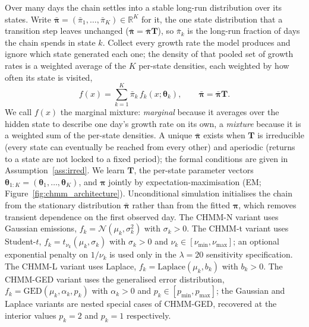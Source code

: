 Over many days the chain settles into a stable long-run distribution over its states. Write $\bar{\boldsymbol\pi} = (\bar\pi_1, \ldots, \bar\pi_K) \in \mathbb{R}^K$ for it, the one state distribution that a transition step leaves unchanged ($\bar{\boldsymbol{\pi}} = \bar{\boldsymbol{\pi}}\mathbf{T}$), so $\bar\pi_k$ is the long-run fraction of days the chain spends in state $k$. Collect every growth rate the model produces and ignore which state generated each one; the density of that pooled set of growth rates is a weighted average of the $K$ per-state densities, each weighted by how often its state is visited,
\begin{equation}
    f(x) = \sum_{k=1}^{K} \bar{\pi}_k\, f_k(x; \boldsymbol\theta_k), \qquad \bar{\boldsymbol{\pi}} = \bar{\boldsymbol{\pi}} \mathbf{T}.
    \label{eq:mixture}
\end{equation}
We call $f(x)$ the marginal mixture: \emph{marginal} because it averages over the hidden state to describe one day's growth rate on its own, a \emph{mixture} because it is a weighted sum of the per-state densities. A unique $\bar{\boldsymbol\pi}$ exists when $\mathbf{T}$ is irreducible (every state can eventually be reached from every other) and aperiodic (returns to a state are not locked to a fixed period); the formal conditions are given in Assumption~\ref{ass:irred}. We learn $\mathbf{T}$, the per-state parameter vectors $\boldsymbol\theta_{1:K} = (\boldsymbol\theta_1, \ldots, \boldsymbol\theta_K)$, and $\boldsymbol{\pi}$ jointly by expectation-maximisation (EM; Figure~\ref{fig:chmm_architecture}). Unconditional simulation initialises the chain from the stationary distribution $\bar{\boldsymbol\pi}$ rather than from the fitted $\boldsymbol\pi$, which removes transient dependence on the first observed day. The CHMM-N variant uses Gaussian emissions, $f_k = \mathcal{N}(\mu_k, \sigma_k^2)$ with $\sigma_k > 0$. The CHMM-t variant uses Student-$t$, $f_k = t_{\nu_k}(\mu_k, \sigma_k)$ with $\sigma_k > 0$ and $\nu_k \in [\nu_{\min}, \nu_{\max}]$; an optional exponential penalty on $1/\nu_k$ is used only in the $\lambda=20$ sensitivity specification. The CHMM-L variant uses Laplace, $f_k = \mathrm{Laplace}(\mu_k, b_k)$ with $b_k > 0$. The CHMM-GED variant uses the generalised error distribution, $f_k = \mathrm{GED}(\mu_k, \alpha_k, p_k)$ with $\alpha_k > 0$ and $p_k \in [p_{\min}, p_{\max}]$; the Gaussian and Laplace variants are nested special cases of CHMM-GED, recovered at the interior values $p_k = 2$ and $p_k = 1$ respectively.

